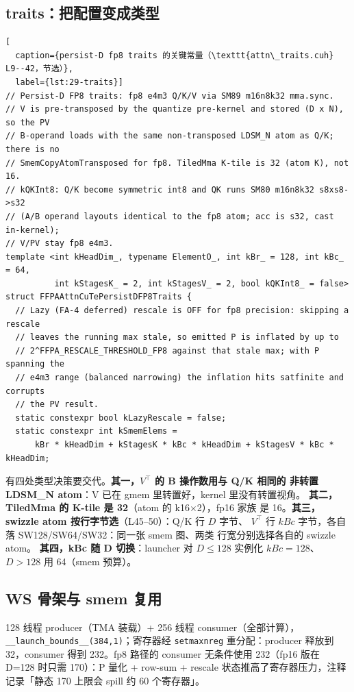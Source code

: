 \subsection{traits：把配置变成类型}

\begin{lstlisting}[
  caption={persist-D fp8 traits 的关键常量（\texttt{attn\_traits.cuh} L9--42，节选）},
  label={lst:29-traits}]
// Persist-D FP8 traits: fp8 e4m3 Q/K/V via SM89 m16n8k32 mma.sync.
// V is pre-transposed by the quantize pre-kernel and stored (D x N), so the PV
// B-operand loads with the same non-transposed LDSM_N atom as Q/K; there is no
// SmemCopyAtomTransposed for fp8. TiledMma K-tile is 32 (atom K), not 16.
// kQKInt8: Q/K become symmetric int8 and QK runs SM80 m16n8k32 s8xs8->s32
// (A/B operand layouts identical to the fp8 atom; acc is s32, cast in-kernel);
// V/PV stay fp8 e4m3.
template <int kHeadDim_, typename ElementO_, int kBr_ = 128, int kBc_ = 64,
          int kStagesK_ = 2, int kStagesV_ = 2, bool kQKInt8_ = false>
struct FFPAAttnCuTePersistDFP8Traits {
  // Lazy (FA-4 deferred) rescale is OFF for fp8 precision: skipping a rescale
  // leaves the running max stale, so emitted P is inflated by up to
  // 2^FFPA_RESCALE_THRESHOLD_FP8 against that stale max; with P spanning the
  // e4m3 range (balanced narrowing) the inflation hits satfinite and corrupts
  // the PV result.
  static constexpr bool kLazyRescale = false;
  static constexpr int kSmemElems =
      kBr * kHeadDim + kStagesK * kBc * kHeadDim + kStagesV * kBc * kHeadDim;
\end{lstlisting}

有四处类型决策要交代。\textbf{其一，$V^{\top}$ 的 B 操作数用与 Q/K 相同的
非转置 LDSM\_N atom}：V 已在 gmem 里转置好，kernel 里没有转置视角。
\textbf{其二，TiledMma 的 K-tile 是 32}（atom 的 k16$\times$2），fp16 家族
是 16。\textbf{其三，swizzle atom 按行字节选}（L45--50）：Q/K 行 $D$ 字节、
$V^{\top}$ 行 $kBc$ 字节，各自落 SW128/SW64/SW32：同一张 smem 图、两类
行宽分别选择各自的 swizzle atom。
\textbf{其四，kBc 随 D 切换}：launcher 对 $D\le128$ 实例化 $kBc{=}128$、
$D>128$ 用 64（smem 预算）。

\subsection{WS 骨架与 smem 复用}

128 线程 producer（TMA 装载）+ 256 线程 consumer（全部计算），
\texttt{\_\_launch\_bounds\_\_(384,1)}；寄存器经 \texttt{setmaxnreg}
重分配：producer 释放到 32，consumer 得到 232。fp8 路径的 consumer
无条件使用 232（fp16 版在 D=128 时只需 170）：P 量化 + row-sum + rescale
状态推高了寄存器压力，注释记录「静态 170 上限会 spill 约 60 个寄存器」。

